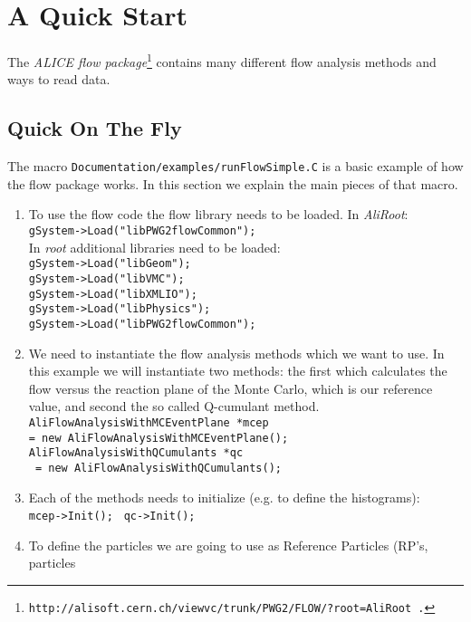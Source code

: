 \chapter{A Quick Start}
\label{quickstart}
The \textit{ALICE flow package}\footnote{\texttt{http://alisoft.cern.ch/viewvc/trunk/PWG2/FLOW/?root=AliRoot .}} contains many different flow analysis methods and ways to read data. 
\section{Quick On The Fly}
The macro \texttt{Documentation/examples/runFlowSimple.C} 
 is a basic example of how the flow package works. 
In this section we explain the main pieces of that macro.

\begin{enumerate}
\item
To use the flow code the flow library needs to be loaded. In  \textit{AliRoot}:\\
\texttt{gSystem->Load("libPWG2flowCommon");}\\
In  \textit{root} additional libraries need to be loaded: \\
\texttt{gSystem->Load("libGeom");}\\
\texttt{gSystem->Load("libVMC");}\\
\texttt{gSystem->Load("libXMLIO");}\\
\texttt{gSystem->Load("libPhysics");}\\
\texttt{gSystem->Load("libPWG2flowCommon");}\\
\item
We need to instantiate the flow analysis methods which we want to use. In this example we will
instantiate two methods: the first  which calculates the flow versus the reaction plane of the Monte Carlo, which is our reference value, and second the so called Q-cumulant method.
\texttt{AliFlowAnalysisWithMCEventPlane *mcep} \\
\texttt{= new AliFlowAnalysisWithMCEventPlane();}\\
\texttt{AliFlowAnalysisWithQCumulants *qc}\\
 \texttt{ = new AliFlowAnalysisWithQCumulants();}\\
 \item
 Each of the methods needs to initialize (e.g. to define the histograms): \\
 \texttt{mcep->Init(); }
\texttt{qc->Init();}\\
\item
To define the particles we are going to use as Reference Particles (RP's, particles 

\end{enumerate}
